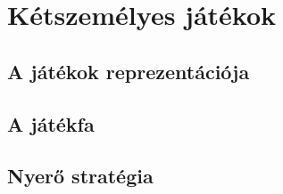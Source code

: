\section{Kétszemélyes játékok}

\subsection{A játékok reprezentációja}

\subsection{A játékfa}

\subsection{Nyerő stratégia}
